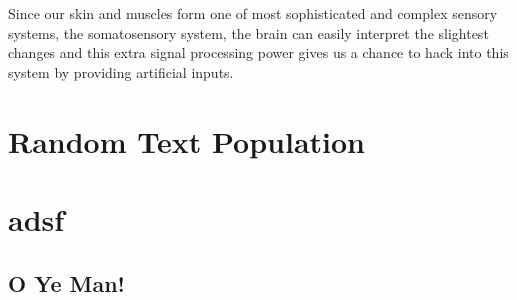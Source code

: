Since our skin and muscles form one of most sophisticated and complex sensory systems, the somatosensory system, the brain can easily interpret the slightest changes and this extra signal processing power gives us a chance to hack into this system by providing artificial inputs. 



\section{Random Text Population}
\kant[3-14]
\section{adsf}

\kant[3-5]



\subsection{O Ye Man!}

\kant[3-5]
